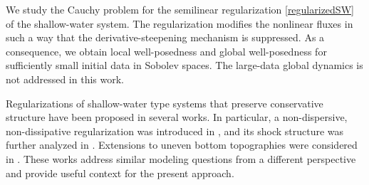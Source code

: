 \documentclass[reqno,12pt,a4paper]{article}
\theoremstyle{plain}
\begin{document}
We study the Cauchy problem for the semilinear regularization \eqref{regularizedSW}
of the shallow-water system.
The regularization modifies the nonlinear fluxes in such a way
that the derivative-steepening mechanism is suppressed.
As a consequence, we obtain local well-posedness
and global well-posedness for sufficiently small initial data in Sobolev spaces.
The large-data global dynamics is not addressed in this work.


Regularizations of shallow-water type systems that preserve conservative structure
have been proposed in several works.
In particular, a non-dispersive, non-dissipative regularization was introduced in
\cite{Clamond_Dutykh2018non_dispersive_conservative_regularization},
and its shock structure was further analyzed in \cite{Pu_Pego_Dutykh_Clamond2018}.
Extensions to uneven bottom topographies were considered in \cite{Clamond_Dutykh_Mitsotakis2019}.
These works address similar modeling questions from a different perspective
and provide useful context for the present approach.









\end{document}
